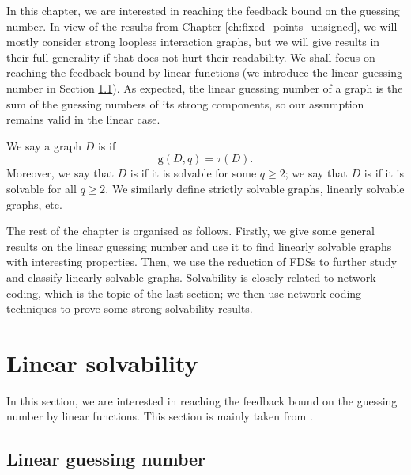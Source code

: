 \documentclass[a4paper, 11pt]{book}
\numberwithin{equation}{section}
\theoremstyle{plain}
\newcommand{\feedback}{\tau}
\newcommand{\guessing}{\mathrm{g}}
\renewcommand{\(}{\ldbrack}
\renewcommand{\)}{\rdbrack}
\newcommand{\BF}[1]{{\bf\boldmath{#1}\unboldmath}}
\begin{document}
In this chapter, we are interested in reaching the feedback bound on the guessing number. In view of the results from Chapter \ref{ch:fixed_points_unsigned}, we will mostly consider strong loopless interaction graphs, but we will give results in their full generality if that does not hurt their readability. We shall focus on reaching the feedback bound by linear functions (we introduce the linear guessing number in Section \ref{sec:gL}). As expected, the linear guessing number of a graph is the sum of the guessing numbers of its strong components, so our assumption remains valid in the linear case.

We say a graph $D$ is \BF{$q$-solvable} if 
\[
	\guessing(D, q) = \feedback(D).
\]
Moreover, we say that $D$ is \BF{solvable} if it is solvable for some $q \ge 2$; we say that $D$ is \BF{all-solvable} if it is solvable for all $q \ge 2$. We similarly define strictly solvable graphs, linearly solvable graphs, etc.

The rest of the chapter is organised as follows. Firstly, we give some general results on the linear guessing number and use it to find linearly solvable graphs with interesting properties. Then, we use the reduction of FDSs to further study and classify linearly solvable graphs. Solvability is closely related to network coding, which is the topic of the last section; we then use network coding techniques to prove some strong solvability results.


\section{Linear solvability} \label{sec:linear_solvability}

In this section, we are interested in reaching the feedback bound on the guessing number by linear functions. This section is mainly taken from \cite{GR11}.

\subsection{Linear guessing number} \label{sec:gL}
\end{document}
